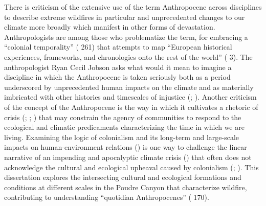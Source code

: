 \documentclass[
]{article}
\begin{document}
There is criticism of the extensive use of the term Anthropocene across disciplines to describe extreme wildfires in particular and unprecedented changes to our climate more broadly which manifest in other forms of devastation. Anthropologists are among those who problematize the term, for embracing a ``colonial temporality'' ( 261) that attempts to map ``European historical experiences, frameworks, and chronologies onto the rest of the world'' ( 3). The anthropologist Ryan Cecil Jobson asks what would it mean to imagine a discipline in which the Anthropocene is taken seriously both as a period underscored by unprecedented human impacts on the climate and as materially imbricated with other histories and timescales of injustice (; ). Another criticism of the concept of the Anthropocene is the way in which it cultivates a rhetoric of crisis (; ; ) that may constrain the agency of communities to respond to the ecological and climatic predicaments characterizing the time in which we are living. Examining the logic of colonialism and its long-term and large-scale impacts on human-environment relations () is one way to challenge the linear narrative of an impending and apocalyptic climate crisis () that often does not acknowledge the cultural and ecological upheaval caused by colonialism (; ). This dissertation explores the intersecting cultural and ecological formations and conditions at different scales in the Poudre Canyon that characterize wildfire, contributing to understanding ``quotidian Anthropocenes'' ( 170).
\end{document}
